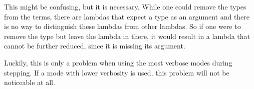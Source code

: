 This might be confusing,
but it is necessary.
While one could remove the types from the terms,
there are lambdas that expect a type as an argument
and there is no way to distinguish these lambdas from other lambdas.
So if one were to remove the type but leave the lambda in there,
it would result in a lambda that cannot be further reduced,
since it is missing its argument.

Luckily,
this is only a problem when using the most verbose modes during stepping.
If a mode with lower verbosity is used,
this problem will not be noticeable at all.

